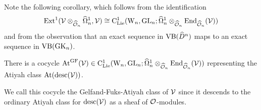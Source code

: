 Note the following corollary, which follows from the identification 
$${\rm Ext}^1(\mathcal{V} \otimes_{\widehat{\mathcal O}_n} \widehat{\Omega}_{n}^1, \mathcal{V}) \cong {\rm C}_{{\rm Lie}}^1({{\rm W}_n},{\rm GL}_n; \widehat{\Omega}^1_n \otimes_{\widehat{\mathcal O}_n} {\rm End}_{\widehat{\mathcal O}_n}(\mathcal{V}))$$ 
and from the observation that an exact sequence in ${\rm VB}(\widehat{D}^n)$ maps to an exact sequence in ${\rm VB}({\rm GK}_n)$.

\begin{cor}
There is a cocycle ${\rm At}^{\rm GF}(\mathcal{V}) \in {\rm C}_{{\rm Lie}}^1({{\rm W}_n},{\rm GL}_n; \widehat{\Omega}^1_n \otimes_{\widehat{\mathcal O}_n} {\rm End}_{\widehat{\mathcal O}_n}(\mathcal{V}))$ representing the Atiyah class ${\rm At}({\rm desc}(\mathcal{V}))$. 
\end{cor}

We call this cocycle the Gelfand-Fuks-Atiyah class of $\mathcal{V}$ since it
descends to the ordinary Atiyah class for ${\rm desc}(\mathcal{V})$ as a sheaf of
$\mathcal O$-modules. 





